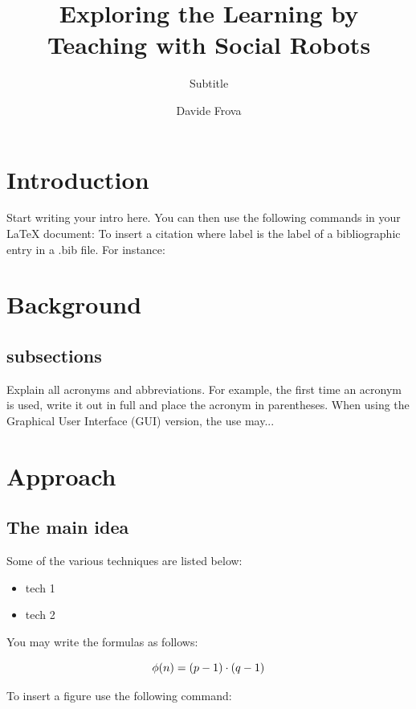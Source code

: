 \documentclass[a4paper]{usiinfbachelorproject}
\author{Davide Frova}
\title{\textbf{Exploring the Learning by Teaching with Social Robots}}
\subtitle{Subtitle}
\begin{document}
\maketitle
\tableofcontents\newpage

\section{\textbf{Introduction}}
Start writing your intro here. You can then use the following commands in your LaTeX document:
\cite{label} To insert a citation where label is the label of a bibliographic entry in a .bib file. For instance:\cite{Hamari}\\




\section{\textbf{Background}}
\subsection{\textbf{subsections}}
Explain all acronyms and abbreviations. For example, the first time an acronym is used, write it out in full and place the acronym in
parentheses. When using the Graphical User Interface (GUI) version, the use may...



\section{\textbf{Approach}}
\subsection{\textbf{The main idea}}
Some of the various techniques are listed below:

\begin{itemize}
    \item tech 1
    \item tech 2
\end{itemize}

\noindent You may write the formulas as follows:

\begin{equation}
    \phi(n) = (p-1) \cdot (q-1)\\
\end{equation}




To insert a figure use the following command:
\end{document}
